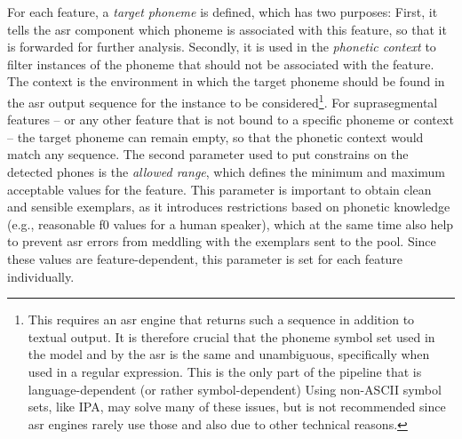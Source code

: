 For each feature, a \emph{target phoneme} is defined, which has two purposes:
First, it tells the \ac{asr} component which phoneme is associated with this feature, so that it is forwarded for further analysis.
Secondly, it is used in the \emph{phonetic context} to filter instances of the phoneme that should not be associated with the feature.
The context is the environment in which the target phoneme should be found in the \ac{asr} output sequence for the instance to be considered\footnote{This requires an \ac{asr} engine that returns such a sequence in addition to textual output.
It is therefore crucial that the phoneme symbol set used in the model and by the \ac{asr} is the same and unambiguous, specifically when used in a regular expression.
This is the only part of the pipeline that is language-dependent (or rather symbol-dependent)
Using non-ASCII symbol sets, like IPA, may solve many of these issues, but is not recommended since \ac{asr} engines rarely use those and also due to other technical reasons.}.
For suprasegmental features -- or any other feature that is not bound to a specific phoneme or context -- the target phoneme can remain empty, so that the phonetic context would match any sequence.
The second parameter used to put constrains on the detected phones is the \emph{allowed range}, which defines the minimum and maximum acceptable values for the feature.
This parameter is important to obtain clean and sensible exemplars, as it introduces restrictions based on phonetic knowledge (e.g., reasonable \ac{f0} values for a human speaker), which at the same time also help to prevent \ac{asr} errors from meddling with the exemplars sent to the pool.
Since these values are feature-dependent, this parameter is set for each feature individually.
